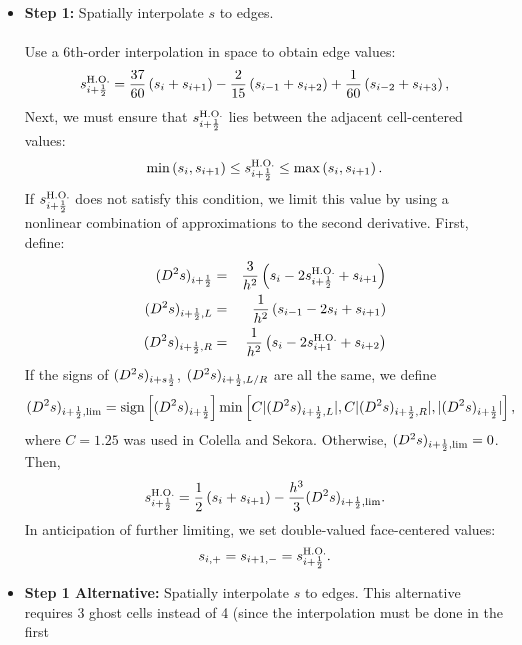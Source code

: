 \begin{itemize}
\item {\bf Step 1:} Spatially interpolate $s$ to edges.\\ \\
Use a 6th-order interpolation in space to obtain edge values:
\begin{equation}
s_{i+\frac{1}{2}}^{\text{H.O.}} = \frac{37}{60}\left(s_{i}+s_{i+1}\right) - \frac{2}{15}\left(s_{i-1}+s_{i+2}\right) + \frac{1}{60}\left(s_{i-2}+s_{i+3}\right),
\end{equation}
Next, we must ensure that $s_{i+\frac{1}{2}}^{\text{H.O.}}$ lies between the adjacent 
cell-centered values:
\begin{equation}
\min\left(s_{i},s_{i+1}\right) \le s_{i+\frac{1}{2}}^{\text{H.O.}} \le \max\left(s_{i},s_{i+1}\right).
\end{equation}
If $s_{i+\frac{1}{2}}^{\text{H.O.}}$ does not satisfy this condition, we limit this value
by using a nonlinear combination of approximations to the second derivative.
First, define:
\begin{eqnarray}
(D^2s)_{i+\frac{1}{2}} &=& \frac{3}{h^2}\left(s_{i}-2s_{i+\frac{1}{2}}^{\text{H.O.}}+s_{i+1}\right) \\
(D^2s)_{i+\frac{1}{2},L} &=& \frac{1}{h^2}\left(s_{i-1}-2s_{i}+s_{i+1}\right) \\
(D^2s)_{i+\frac{1}{2},R} &=& \frac{1}{h^2}\left(s_{i}-2s_{i+1}^{\text{H.O.}}+s_{i+2}\right)
\end{eqnarray}
If the signs of $(D^2s)_{i+s\frac{1}{2}}$, $(D^2s)_{i+\frac{1}{2},L/R}$ are all the
same, we define
\begin{equation}
(D^2s)_{i+\frac{1}{2},\text{lim}} = \text{sign}\left[(D^2s)_{i+\frac{1}{2}}\right]\min\left[C|(D^2s)_{i+\frac{1}{2},L}|,C|(D^2s)_{i+\frac{1}{2},R}|,|(D^2s)_{i+\frac{1}{2}}|\right],
\end{equation}
where $C=1.25$ was used in Colella and Sekora.  Otherwise, 
$(D^2s)_{i+\frac{1}{2},\text{lim}}=0$.  Then,
\begin{equation}
s_{i+\frac{1}{2}}^{\text{H.O.}} = \frac{1}{2}\left(s_{i}+s_{i+1}\right) - \frac{h^3}{3}(D^2s)_{i+\frac{1}{2},\text{lim}}.
\end{equation}
In anticipation of further limiting, we set double-valued face-centered values:
\begin{equation}
s_{i,+} = s_{i+1,-} = s_{i+\frac{1}{2}}^{\text{H.O.}}.
\end{equation}
\item {\bf Step 1 Alternative:} Spatially interpolate $s$ to edges.  This alternative
requires 3 ghost cells instead of 4 (since the interpolation must be done in the first

\end{itemize}
